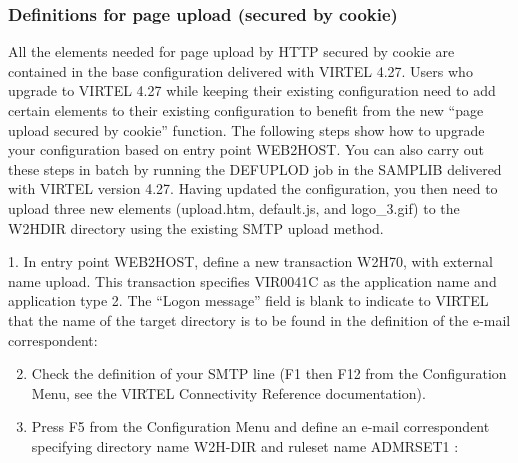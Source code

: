 \documentclass[letterpaper,10pt,english]{sphinxmanual}
\begin{document}
\subsubsection{Definitions for page upload (secured by cookie)}
\label{\detokenize{audit_operations_ and_performance:definitions-for-page-upload-secured-by-cookie}}
All the elements needed for page upload by HTTP secured by cookie are contained in the base configuration delivered
with VIRTEL 4.27. Users who upgrade to VIRTEL 4.27 while keeping their existing configuration need to add certain
elements to their existing configuration to benefit from the new “page upload secured by cookie” function.
The following steps show how to upgrade your configuration based on entry point WEB2HOST. You can also carry out
these steps in batch by running the DEFUPLOD job in the SAMPLIB delivered with VIRTEL version 4.27. Having updated
the configuration, you then need to upload three new elements (upload.htm, default.js, and logo\_3.gif) to the W2HDIR
directory using the existing SMTP upload method.

1. In entry point WEB2HOST, define a new transaction W2H\textendash{}70, with external name upload. This transaction specifies
VIR0041C as the application name and application type 2. The “Logon message” field is blank to indicate to VIRTEL
that the name of the target directory is to be found in the definition of the e-mail correspondent:


\begin{enumerate}
\setcounter{enumi}{1}
\item {} 
Check the definition of your SMTP line (F1 then F12 from the Configuration Menu, see the VIRTEL Connectivity Reference documentation).

\item {} 
Press F5 from the Configuration Menu and define an e-mail correspondent specifying directory name W2H-DIR and ruleset name ADMRSET1 :

\end{enumerate}
\end{document}
